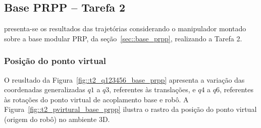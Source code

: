 \clearpage
\subsection{Base PRPP -- Tarefa 2}

presenta-se os resultados das trajetórias considerando o manipulador montado
sobre a base modular PRP, da seção~\ref{sec::base_prpp}, realizando a Tarefa 2.

\subsubsection{Posição do ponto virtual}

O reusltado da Figura~\ref{fig::t2_q123456_base_prpp} apresenta a variação das
coordenadas generalizadas $q1$ a $q3$, referentes às translações, e $q4$ a $q6$,
referentes às rotações do ponto virtual de acoplamento base e robô. A
Figura~\ref{fig::t2_pvirtural_base_prpp} ilustra o rastro da posição do ponto
virtual (origem do robô) no ambiente 3D.

